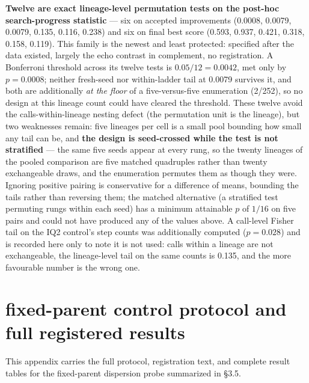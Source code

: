 \textbf{Twelve are exact lineage-level permutation tests on the post-hoc search-progress statistic} --- six on accepted improvements (0.0008, 0.0079, 0.0079, 0.135, 0.116, 0.238) and six on final best score (0.593, 0.937, 0.421, 0.318, 0.158, 0.119). This family is the newest and least protected: specified after the data existed, largely the echo contrast in complement, no registration. A Bonferroni threshold across its twelve tests is $0.05/12 = 0.0042$, met only by $p = 0.0008$; neither fresh-seed nor within-ladder tail at 0.0079 survives it, and both are additionally \emph{at the floor} of a five-versus-five enumeration (2/252), so no design at this lineage count could have cleared the threshold. These twelve avoid the calls-within-lineage nesting defect (the permutation unit is the lineage), but two weaknesses remain: five lineages per cell is a small pool bounding how small any tail can be, and \textbf{the design is seed-crossed while the test is not stratified} --- the same five seeds appear at every rung, so the twenty lineages of the pooled comparison are five matched quadruples rather than twenty exchangeable draws, and the enumeration permutes them as though they were. Ignoring positive pairing is conservative for a difference of means, bounding the tails rather than reversing them; the matched alternative (a stratified test permuting rungs within each seed) has a minimum attainable $p$ of $1/16$ on five pairs and could not have produced any of the values above. A call-level Fisher tail on the IQ2 control's step counts was additionally computed ($p = 0.028$) and is recorded here only to note it is not used: calls within a lineage are not exchangeable, the lineage-level tail on the same counts is 0.135, and the more favourable number is the wrong one.

\section{fixed-parent control protocol and full registered results}

This appendix carries the full protocol, registration text, and complete result tables for the fixed-parent dispersion probe summarized in \S3.5.

